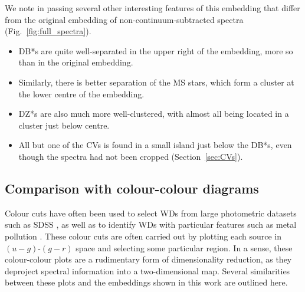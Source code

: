 \documentclass[fleqn,usenatbib]{mnras}
\begin{document}
We note in passing several other interesting features of this embedding that differ from the original embedding of non-continuum-subtracted spectra (Fig.~\ref{fig:full_spectra}).
\begin{itemize}
\item
DB*s are quite well-separated in the upper right of the embedding, more so than in the original embedding.
\item
Similarly, there is better separation of the MS stars, which form a cluster at the lower centre of the embedding.
\item
DZ*s are also much more well-clustered, with almost all being located in a cluster just below centre.
\item
All but one of the CVs is found in a small island just below the DB*s, even though the spectra had not been cropped (Section~\ref{sec:CVs}).
\end{itemize}

\subsection{Comparison with colour-colour diagrams}
\label{sec:colourcolour}

Colour cuts have often been used to select WDs from large photometric datasets such as SDSS \citep{eisenstein06, gentilefusillo15}, as well as to identify WDs with particular features such as metal pollution \citep{hollands15}.
These colour cuts are often carried out by plotting each source in $(u-g)$-$(g-r)$ space and selecting some particular region.
In a sense, these colour-colour plots are a rudimentary form of dimensionality reduction, as they deproject spectral information into a two-dimensional map.
Several similarities between these plots and the embeddings shown in this work are outlined here.
\end{document}

